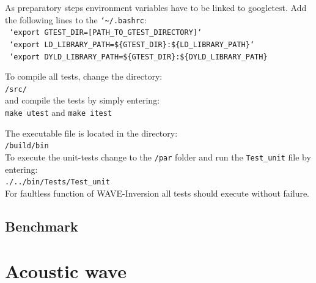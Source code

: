 \documentclass[pdftex,a4paper,parskip,listof=totoc,bibliography=totoc,onehalfspacing,12pt]{scrreprt}
\newcommand{\shellcmd}[1]{\indent\indent\texttt{#1}}	%
\newcommand{\shellcmdline}[1]{\indent\indent\texttt{\quad#1}} 	%
\begin{document}
As preparatory steps environment variables have to be linked to googletest. Add the following lines to the \shellcmd{{\char`\~}/.bashrc}:
\\\shellcmdline{ `export GTEST\_DIR=[PATH\_TO\_GTEST\_DIRECTORY]`}
\\\shellcmdline{ `export LD\_LIBRARY\_PATH=\$\{GTEST\_DIR\}:\$\{LD\_LIBRARY\_PATH\}`}
\\\shellcmdline{ `export DYLD\_LIBRARY\_PATH=\$\{GTEST\_DIR\}:\$\{DYLD\_LIBRARY\_PATH\}}

To compile all tests, change the directory: \\\shellcmdline{/src/} \\ and compile the tests by simply entering:\\\shellcmdline{make utest} and \shellcmdline{make itest}

The executable file is located in the directory:
\\\shellcmdline{/build/bin}\\
To execute the unit-tests change to the \shellcmd{/par} folder and run the \shellcmd{Test\_unit} file by entering:
\\\shellcmdline{./../bin/Tests/Test\_unit}\\ 
For faultless function of WAVE-Inversion all tests should execute without failure.

\section{Benchmark}

\cleardoublepage
{}
\listoffigures
{}
\listoftables
{}
\cleardoublepage
% 



\appendix
\chapter{Acoustic wave}
\label{sec:Acoustic_wave_equation}
\end{document}

